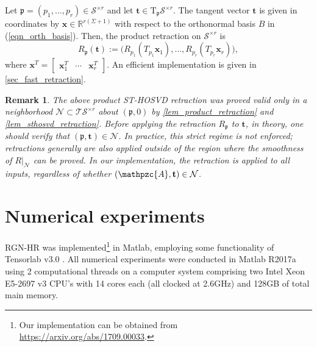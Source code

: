 \documentclass[a4paper,10pt,final]{siamart1116}
\newcommand{\tuple}[1]{\mathfrak{#1}}
\newcommand{\Var}[1]{\mathcal{#1}}
\newcommand{\tensor}[1]{\mathpzc{#1}}
\newcommand{\vect}[1]{\mathbf{#1}}
\newcommand{\Tang}[2]{\mathrm{T}_{#1} {#2}}
\newcommand{\R}{\mathbb{R}}
\newcommand{\reflem}[1]{\cref{#1}}
\newcommand{\refeqn}[1]{{(\ref{#1})}}
\newcommand{\refsec}[1]{{\cref{#1}}}
\newcommand{\refprop}[1]{{\cref{#1}}}
\newtheorem{remark}[theorem]{Remark}
\numberwithin{equation}{section}
\numberwithin{figure}{section}
\numberwithin{table}{section}
\numberwithin{theorem}{section}
\begin{document}
Let $\tuple{p} = (p_1,\ldots,p_r) \in \Var{S}^{\times r}$ and let $\vect{t} \in \Tang{\tuple{p}}{\Var{S}^{\times r}}$. The tangent vector $\vect{t}$ is given in coordinates by $\vect{x} \in \R^{r(\Sigma+1)}$ with respect to the orthonormal basis $B$ in \refeqn{eqn_orth_basis}. Then, the product retraction on $\Var{S}^{\times r}$ is
\[
 R_{\tuple{p}}(\vect{t}) := \bigl( R_{p_1}(T_{p_1} \vect{x}_1), \ldots, R_{p_r}(T_{p_r} \vect{x}_r) \bigr),
\]
where $\vect{x}^T = \begin{bmatrix} \vect{x}_1^T & \cdots & \vect{x}_r^T \end{bmatrix}$. An efficient implementation is given in \refsec{sec_fast_retraction}.

\begin{remark}
The above product ST-HOSVD retraction was proved valid only in a neighborhood $\Var{N} \subset \Var{T}\Var{S}^{\times r}$ about $(\tuple{p}, 0)$ by \refprop{lem_product_retraction} and \reflem{lem_sthosvd_retraction}. Before applying the retraction $R_{\tuple{p}}$ to $\vect{t}$, in theory, one should verify that $(\tuple{p}, \vect{t}) \in \Var{N}$. In practice, this strict regime is not enforced; retractions generally are also applied outside of the region where the smoothness of $R|_{\Var{N}}$ can be proved. In our implementation, the retraction is applied to all inputs, regardless of whether $(\tensor{A}, \vect{t}) \in \Var{N}$.
\end{remark}

\section{Numerical experiments} \label{sec_numerical_experiments}
RGN-HR was implemented\footnote{Our implementation can be obtained from \url{https://arxiv.org/abs/1709.00033}.} in Matlab, employing some functionality of Tensorlab v3.0 \cite{Tensorlab}.
All numerical experiments were conducted in Matlab R2017a using 2 computational threads on a computer system comprising two Intel Xeon E5-2697 v3 CPU's with 14 cores each (all clocked at 2.6GHz) and 128GB of total main memory.
\end{document}
